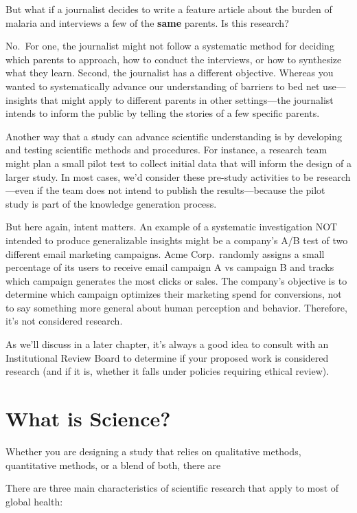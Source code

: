 \documentclass[justified,twoside,symmetric,]{tufte-book}
\renewcommand*{\citep}[1]{{\cite{#1}}}
\begin{document}
But what if a journalist decides to write a feature article about the burden of malaria and interviews a few of the \textbf{same} parents. Is this research?

No.~For one, the journalist might not follow a systematic method for deciding which parents to approach, how to conduct the interviews, or how to synthesize what they learn. Second, the journalist has a different objective. Whereas you wanted to systematically advance our understanding of barriers to bed net use---insights that might apply to different parents in other settings---the journalist intends to inform the public by telling the stories of a few specific parents.

Another way that a study can advance scientific understanding is by developing and testing scientific methods and procedures. For instance, a research team might plan a small pilot test to collect initial data that will inform the design of a larger study. In most cases, we'd consider these pre-study activities to be research---even if the team does not intend to publish the results---because the pilot study is part of the knowledge generation process.

But here again, intent matters. An example of a systematic investigation NOT intended to produce generalizable insights might be a company's A/B test of two different email marketing campaigns. Acme Corp.~randomly assigns a small percentage of its users to receive email campaign A vs campaign B and tracks which campaign generates the most clicks or sales. The company's objective is to determine which campaign optimizes their marketing spend for conversions, not to say something more general about human perception and behavior. Therefore, it's not considered research.

As we'll discuss in a later chapter, it's always a good idea to consult with an Institutional Review Board to determine if your proposed work is considered research (and if it is, whether it falls under policies requiring ethical review).

\hypertarget{what-is-science}{%
\section{What is Science?}\label{what-is-science}}

Whether you are designing a study that relies on qualitative methods, quantitative methods, or a blend of both, there are

There are three main characteristics of scientific research that apply to most of global health:\citep{king:1994}
\end{document}
